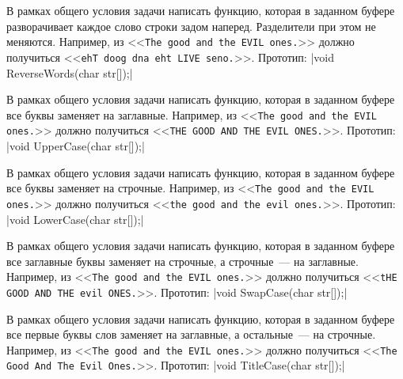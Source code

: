 
\begin{zztask}
В рамках общего условия задачи написать функцию, которая в заданном буфере
разворачивает каждое слово строки задом наперед. Разделители при этом не
меняются.
Например, из
<<\texttt{The good and the EVIL ones.}>>
должно получиться
<<\texttt{ehT doog dna eht LIVE seno.}>>.
%
Прототип: |void ReverseWords(char str[]);|
\end{zztask}


\begin{zztask}
В рамках общего условия задачи написать функцию, которая в заданном буфере
все буквы заменяет на заглавные.
Например, из
<<\texttt{The good and the EVIL ones.}>>
должно получиться
<<\texttt{THE GOOD AND THE EVIL ONES.}>>.
%
Прототип: |void UpperCase(char str[]);|
\end{zztask}


\begin{zztask}
В рамках общего условия задачи написать функцию, которая в заданном буфере
все буквы заменяет на строчные.
Например, из
<<\texttt{The good and the EVIL ones.}>>
должно получиться
<<\texttt{the good and the evil ones.}>>.
%
Прототип: |void LowerCase(char str[]);|
\end{zztask}


\begin{zztask}
В рамках общего условия задачи написать функцию, которая в заданном буфере
все заглавные буквы заменяет на строчные, а строчные~--- на заглавные.
Например, из
<<\texttt{The good and the EVIL ones.}>>
должно получиться
<<\texttt{tHE GOOD AND THE evil ONES.}>>.
%
Прототип: |void SwapCase(char str[]);|
\end{zztask}


\begin{zztask}
В рамках общего условия задачи написать функцию, которая в заданном буфере
все первые буквы слов заменяет на заглавные, а остальные~--- на строчные.
Например, из
<<\texttt{The good and the EVIL ones.}>>
должно получиться
<<\texttt{The Good And The Evil Ones.}>>.
%
Прототип: |void TitleCase(char str[]);|
\end{zztask}

